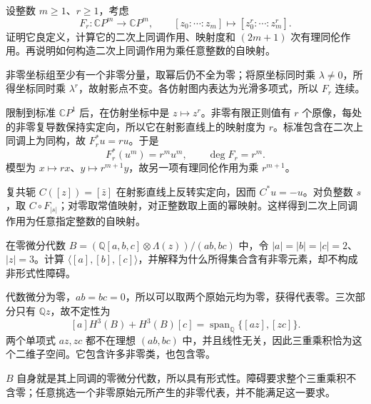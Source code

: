 \begin{exercise}\label{g2:ex:projective-power-map}
	设整数 \(m\geq1\)、\(r\geq1\)，考虑
	\[
		F_r:\mathbb CP^m\longrightarrow\mathbb CP^m,
		\qquad [z_0:\cdots:z_m]\longmapsto[z_0^r:\cdots:z_m^r].
	\]
	证明它良定义，计算它的二次上同调作用、映射度和 \((2m+1)\) 次有理同伦作用。再说明如何构造二次上同调作用为乘任意整数的自映射。
\end{exercise}
\begin{solution}
	非零坐标组至少有一个非零分量，取幂后仍不全为零；将原坐标同时乘 \(\lambda\ne0\)，所得坐标同时乘 \(\lambda^r\)，故射影点不变。各仿射图内表达为光滑多项式，所以 \(F_r\) 连续。

	限制到标准 \(\mathbb CP^1\) 后，在仿射坐标中是 \(z\mapsto z^r\)。非零有限正则值有 \(r\) 个原像，每处的非零复导数保持实定向，所以它在射影直线上的映射度为 \(r\)。标准包含在二次上同调上为同构，故 \(F_r^*u=ru\)。于是
	\[
		F_r^*(u^m)=r^m u^m,\qquad \deg F_r=r^m.
	\]
	模型为 \(x\mapsto rx\)、\(y\mapsto r^{m+1}y\)，故另一项有理同伦作用为乘 \(r^{m+1}\)。

	复共轭 \(C([z])=[\bar z]\) 在射影直线上反转实定向，因而 \(C^*u=-u\)。对负整数 \(s\)，取 \(C\circ F_{|s|}\)；对零取常值映射，对正整数取上面的幂映射。这样得到二次上同调作用为任意指定整数的自映射。
\end{solution}

\begin{exercise}\label{g2:ex:massey-nonzero-indeterminacy}
	在零微分代数 \(B=(\mathbb Q[a,b,c]\otimes\Lambda(z))/(ab,bc)\) 中，令 \(|a|=|b|=|c|=2\)、\(|z|=3\)。计算 \(\langle[a],[b],[c]\rangle\)，并解释为什么所得集合含有非零元素，却不构成非形式性障碍。
\end{exercise}
\begin{solution}
	代数微分为零，\(ab=bc=0\)，所以可以取两个原始元均为零，获得代表零。三次部分只有 \(\mathbb Qz\)，故不定性为
	\[
		[a]H^3(B)+H^3(B)[c]=\operatorname{span}_{\mathbb Q}\{[az],[zc]\}.
	\]
	两个单项式 \(az,zc\) 都不在理想 \((ab,bc)\) 中，并且线性无关，因此三重乘积恰为这个二维子空间。它包含许多非零类，也包含零。

	\(B\) 自身就是其上同调的零微分代数，所以具有形式性。障碍要求整个三重乘积不含零；任意挑选一个非零原始元所产生的非零代表，并不能满足这一要求。
\end{solution}

